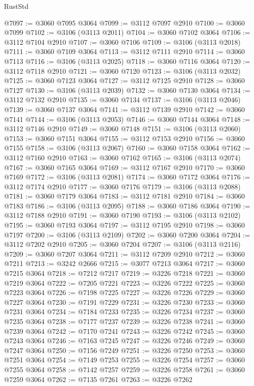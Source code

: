 \begin{lexlean}{RustStd}
\begin{coremodule}
@7097 := @3060 @7095 @3064
@7099 := @3112 @7097 @2910
@7100 := @3060 @7099
@7102 := @3106 (@3113 @2011)
@7104 := @3060 @7102 @3064
@7106 := @3112 @7104 @2910
@7107 := @3060 @7106
@7109 := @3106 (@3113 @2018)
@7111 := @3060 @7109 @3064
@7113 := @3112 @7111 @2910
@7114 := @3060 @7113
@7116 := @3106 (@3113 @2025)
@7118 := @3060 @7116 @3064
@7120 := @3112 @7118 @2910
@7121 := @3060 @7120
@7123 := @3106 (@3113 @2032)
@7125 := @3060 @7123 @3064
@7127 := @3112 @7125 @2910
@7128 := @3060 @7127
@7130 := @3106 (@3113 @2039)
@7132 := @3060 @7130 @3064
@7134 := @3112 @7132 @2910
@7135 := @3060 @7134
@7137 := @3106 (@3113 @2046)
@7139 := @3060 @7137 @3064
@7141 := @3112 @7139 @2910
@7142 := @3060 @7141
@7144 := @3106 (@3113 @2053)
@7146 := @3060 @7144 @3064
@7148 := @3112 @7146 @2910
@7149 := @3060 @7148
@7151 := @3106 (@3113 @2060)
@7153 := @3060 @7151 @3064
@7155 := @3112 @7153 @2910
@7156 := @3060 @7155
@7158 := @3106 (@3113 @2067)
@7160 := @3060 @7158 @3064
@7162 := @3112 @7160 @2910
@7163 := @3060 @7162
@7165 := @3106 (@3113 @2074)
@7167 := @3060 @7165 @3064
@7169 := @3112 @7167 @2910
@7170 := @3060 @7169
@7172 := @3106 (@3113 @2081)
@7174 := @3060 @7172 @3064
@7176 := @3112 @7174 @2910
@7177 := @3060 @7176
@7179 := @3106 (@3113 @2088)
@7181 := @3060 @7179 @3064
@7183 := @3112 @7181 @2910
@7184 := @3060 @7183
@7186 := @3106 (@3113 @2095)
@7188 := @3060 @7186 @3064
@7190 := @3112 @7188 @2910
@7191 := @3060 @7190
@7193 := @3106 (@3113 @2102)
@7195 := @3060 @7193 @3064
@7197 := @3112 @7195 @2910
@7198 := @3060 @7197
@7200 := @3106 (@3113 @2109)
@7202 := @3060 @7200 @3064
@7204 := @3112 @7202 @2910
@7205 := @3060 @7204
@7207 := @3106 (@3113 @2116)
@7209 := @3060 @7207 @3064
@7211 := @3112 @7209 @2910
@7212 := @3060 @7211
@7213 := @3242 @2666
@7215 := @3077 @7213 @3064
@7217 := @3060 @7215 @3064
@7218 := @7212 @7217
@7219 := @3226 @7218
@7221 := @3060 @7219 @3064
@7222 := @7205 @7221
@7223 := @3226 @7222
@7225 := @3060 @7223 @3064
@7226 := @7198 @7225
@7227 := @3226 @7226
@7229 := @3060 @7227 @3064
@7230 := @7191 @7229
@7231 := @3226 @7230
@7233 := @3060 @7231 @3064
@7234 := @7184 @7233
@7235 := @3226 @7234
@7237 := @3060 @7235 @3064
@7238 := @7177 @7237
@7239 := @3226 @7238
@7241 := @3060 @7239 @3064
@7242 := @7170 @7241
@7243 := @3226 @7242
@7245 := @3060 @7243 @3064
@7246 := @7163 @7245
@7247 := @3226 @7246
@7249 := @3060 @7247 @3064
@7250 := @7156 @7249
@7251 := @3226 @7250
@7253 := @3060 @7251 @3064
@7254 := @7149 @7253
@7255 := @3226 @7254
@7257 := @3060 @7255 @3064
@7258 := @7142 @7257
@7259 := @3226 @7258
@7261 := @3060 @7259 @3064
@7262 := @7135 @7261
@7263 := @3226 @7262

\end{coremodule}
\end{lexlean}
